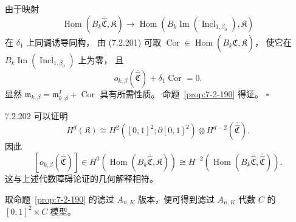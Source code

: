 由于映射
\[
\operatorname{Hom}
(B_k\overline{\widehat{\mathfrak C}},\mathfrak K)
\longrightarrow
\operatorname{Hom}
(B_k\operatorname{Im}
(\operatorname{Incl}_{1,\beta_0}),\mathfrak K)
\]
在 $\delta_1$ 上同调诱导同构，
由 (7.2.201) 可取
$\operatorname{Cor}\in
\operatorname{Hom}
(B_k\overline{\widehat{\mathfrak C}},\mathfrak K)$，
使它在 $B_k\operatorname{Im}
(\operatorname{Incl}_{1,\beta_0})$ 上为零，
且
\[
o_{k,\beta}
(\overline{\widehat{\mathfrak C}})
+\delta_1\operatorname{Cor}=0.
\]
显然
$\mathfrak m_{k,\beta}
=\mathfrak m^I_{k,\beta}
+\operatorname{Cor}$
具有所需性质。
命题~\ref{prop:7-2-190} 得证。
\hfill$\square$

\begin{remark}{7.2.202}\label{rem:7-2-202}
可以证明
\[
H^d(\mathfrak K)
\cong H^2([0,1]^2;\partial[0,1]^2)
\otimes H^{d-2}
(\overline{\widehat{\mathfrak C}}).
\]
因此
\[
[o_{k,\beta}
(\overline{\widehat{\mathfrak C}})]
\in H^0\!\left(
\operatorname{Hom}
(B_k\overline{\widehat{\mathfrak C}},\mathfrak K)
\right)
\cong H^{-2}\!\left(
\operatorname{Hom}
(B_k\overline{\widehat{\mathfrak C}},
\overline{\widehat{\mathfrak C}})
\right).
\]
这与上述代数障碍论证的几何解释相符。
\end{remark}

取命题~\ref{prop:7-2-190} 的滤过
$A_{n,K}$ 版本，便可得到滤过
$A_{n,K}$ 代数 $C$ 的
$[0,1]^2\times C$ 模型。

